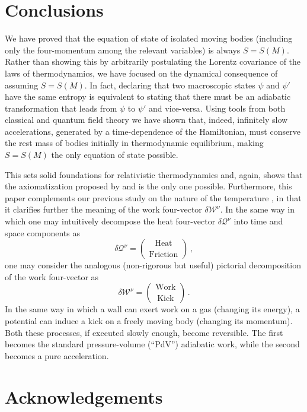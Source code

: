 \documentclass[twocolumn,usenatbib]{mnras2}
\begin{document}
\section{Conclusions}

We have proved that the equation of state of isolated moving bodies (including only the four-momentum among the relevant variables) is always $S=S(M)$. Rather than showing this by arbitrarily postulating the Lorentz covariance of the laws of thermodynamics, we have focused on the dynamical consequence of assuming $S=S(M)$. In fact, declaring that two macroscopic states $\psi$ and $\psi'$ have the same entropy is equivalent to stating that there must be an adiabatic transformation that leads from $\psi$ to $\psi'$ and vice-versa. Using tools from both classical and quantum field theory we have shown that, indeed, infinitely slow accelerations, generated by a time-dependence of the Hamiltonian, must conserve the rest mass of bodies initially in thermodynamic equilibrium, making $S=S(M)$ the only equation of state possible. 

This sets solid foundations for relativistic thermodynamics and, again, shows that the axiomatization proposed by \cite{vanKampen1968} and \cite{Israel2009_book} is the only one possible. Furthermore, this paper complements our previous study on the nature of the temperature \citep{GavassinoTermometri}, in that it clarifies further the meaning of the work four-vector $\delta \mathcal{W}^\nu$. In the same way in which one may intuitively decompose the heat four-vector $\delta \mathcal{Q}^\nu$ into time and space components as 
\begin{equation}
    \delta \mathcal{Q}^\nu = \binom{\text{ Heat }}{\text{ Friction }} \, ,
\end{equation}
one may consider the analogous (non-rigorous but useful) pictorial decomposition of the work four-vector as 
\begin{equation}
    \delta \mathcal{W}^\nu = \binom{\text{ Work }}{\text{ Kick }} \, .
\end{equation}
In the same way in which a wall can exert work on a gas (changing its energy), a potential can induce a kick on a freely moving body (changing its momentum). Both these processes, if executed slowly enough, become reversible. The first becomes the standard pressure-volume (``PdV'') adiabatic work, while the second becomes a pure acceleration.





\section*{Acknowledgements}
\end{document}
